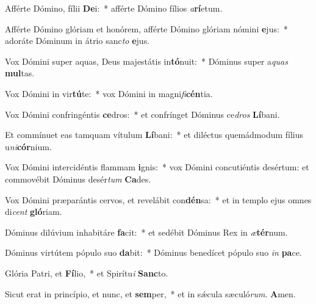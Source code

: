 \item Afférte Dómino, fílii \textbf{De}i:~* afférte Dómino fílios \textit{a}\textbf{rí}etum.
\item Afférte Dómino glóriam et honórem, afférte Dómino glóriam nómini \textbf{e}jus:~* adoráte Dóminum in átrio sanc\textit{to} \textbf{e}jus.
\item Vox Dómini super aquas, Deus majestátis in\textbf{tó}nuit:~* Dóminus super a\textit{quas} \textbf{mul}tas.
\item Vox Dómini in vir\textbf{tú}te:~* vox Dómini in magni\textit{fi}\textbf{cén}tia.
\item Vox Dómini confringéntis \textbf{ce}dros:~* et confrínget Dóminus ce\textit{dros} \textbf{Lí}bani.
\item Et commínuet eas tamquam vítulum \textbf{Lí}bani:~* et diléctus quemádmodum fílius u\textit{ni}\textbf{cór}nium.
\item Vox Dómini intercidéntis flammam \textbf{i}gnis:~* vox Dómini concutiéntis desértum: et commovébit Dóminus desér\textit{tum} \textbf{Ca}des.
\item Vox Dómini præparántis cervos, et revelábit con\textbf{dén}sa:~* et in templo ejus omnes di\textit{cent} \textbf{gló}riam.
\item Dóminus dilúvium inhabitáre \textbf{fa}cit:~* et sedébit Dóminus Rex in \textit{æ}\textbf{tér}num.
\item Dóminus virtútem pópulo suo \textbf{da}bit:~* Dóminus benedícet pópulo suo \textit{in} \textbf{pa}ce.
\item Glória Patri, et \textbf{Fí}lio,~* et Spirítu\textit{i} \textbf{Sanc}to.
\item Sicut erat in princípio, et nunc, et \textbf{sem}per,~* et in sǽcula sæculó\textit{rum}. \textbf{A}men.
